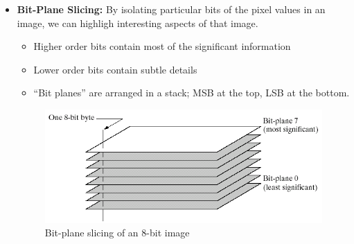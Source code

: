 \begin{itemize}
  \item \textbf{Bit-Plane Slicing:} By isolating particular bits of
    the pixel values in an image, we can highligh interesting aspects
    of that image.
    \begin{itemize}
      \item Higher order bits contain most of the significant information
      \item Lower order bits contain subtle details
      \item \enquote{Bit planes} are arranged in a stack; MSB at the
        top, LSB at the bottom.
    \end{itemize}

    \begin{minipage}{\linewidth}
      \begin{figure}[H]
        \centering
        \includegraphics[width=\linewidth]{images/bit_plane_slicing.png}
        \caption{Bit-plane slicing of an 8-bit image}
      \end{figure}
      \vspace{-0.5cm}
    \end{minipage}

\end{itemize}
